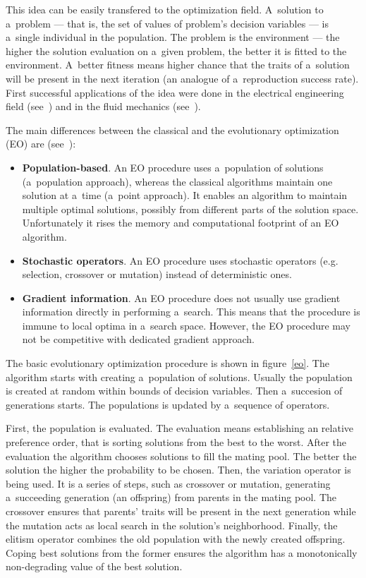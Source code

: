 This idea can be easily transfered to the optimization field. A~solution to
a~problem --- that is, the set of values of problem's decision variables ---
is a~single individual in the population. The problem is the environment ---
the higher the solution evaluation on a~given problem, the better it is fitted
to the environment. A~better fitness means higher chance that the traits of
a~solution will be present in the next iteration (an analogue of
a~reproduction success rate). First successful applications of the idea were
done in the electrical engineering field (see~\cite{Fog64}) and in the fluid
mechanics (see~\cite{Rec65, Sch65}).

The main differences between the classical and the evolutionary optimization
(EO) are (see~\cite{Deb08}):

\begin{itemize}
\item \textbf{Population-based}. An EO procedure uses a~population of
  solutions (a~population approach), whereas the classical algorithms maintain
  one solution at a~time (a~point approach). It enables an algorithm to
  maintain multiple optimal solutions, possibly from different parts of the
  solution space. Unfortunately it rises the memory and computational
  footprint of an EO algorithm.
\item \textbf{Stochastic operators}. An EO procedure uses stochastic operators
  (e.g. selection, crossover or mutation) instead of deterministic ones.
\item \textbf{Gradient information}. An EO procedure does not usually use
  gradient information directly in performing a~search. This means that the
  procedure is immune to local optima in a~search space. However, the EO
  procedure may not be competitive with dedicated gradient approach.
\end{itemize}

The basic evolutionary optimization procedure is shown in figure~\ref{eo}. The
algorithm starts with creating a~population of solutions. Usually the
population is created at random within bounds of decision variables. Then
a~succesion of generations starts. The populations is updated by a~sequence of
operators.

First, the population is evaluated. The evaluation means establishing an
relative preference order, that is sorting solutions from the best to the
worst. After the evaluation the algorithm chooses solutions to fill the mating
pool. The better the solution the higher the probability to be chosen. Then,
the variation operator is being used. It is a series of steps, such as
crossover or mutation, generating a~succeeding generation (an offspring) from
parents in the mating pool. The crossover ensures that parents' traits will be
present in the next generation while the mutation acts as local search in the
solution's neighborhood. Finally, the elitism operator combines the old
population with the newly created offspring. Coping best solutions from the
former ensures the algorithm has a monotonically non-degrading value of the
best solution.


